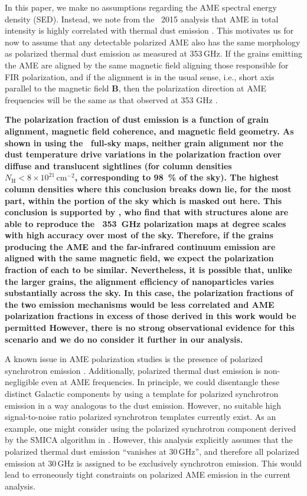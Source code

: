\documentclass[twocolumn]{aa}
\begin{document}
In this paper, we make no assumptions regarding the AME spectral
energy density (SED). Instead, we note from the \Planck\ 2015 analysis
that AME in total intensity is highly correlated with thermal dust
emission \citep{planck2014-a12}.
This motivates us for now to assume that any detectable polarized AME
also has the same morphology as polarized thermal dust emission as
measured at 353\,GHz.  If the grains emitting the AME are aligned by
the same magnetic field aligning those responsible for FIR
polarization, and if the alignment is in the usual sense, i.e., short
axis parallel to the magnetic field \textbf{B}, then the polarization
direction at AME frequencies will be the same as that observed at 353
GHz \citep{draine1998_a}.

\textbf{The polarization fraction of dust emission is a function of grain alignment, magnetic field coherence, and magnetic field geometry. As shown in \cite{planck2016-l11B} using the \Planck\ full-sky maps, neither grain alignment nor the dust temperature drive variations in the polarization fraction over diffuse and translucent sightlines (for column densities $N_{\mathrm{H}} < 8\times10^{21}\,\mathrm{cm}^{-2}$, corresponding to 98~\% of the sky). The highest column densities where this conclusion breaks down lie, for the most part, within the portion of the sky which is masked out here. This conclusion is supported by \cite{Clark_2019}, who find that with  structures alone are able to reproduce the \Planck\ 353~GHz polarization maps at degree scales with high accuracy over most of the sky. Therefore, if the grains producing the AME and the far-infrared continuum emission are aligned with the same magnetic field, we expect the polarization fraction of each to be similar. Nevertheless, it is possible that, unlike the larger grains, the alignment efficiency of nanoparticles varies substantially across the sky. In this case, the polarization fractions of the two emission mechanisms would be less correlated and AME polarization fractions in excess of those derived in this work would be permitted However, there is no strong observational evidence for this scenario and we do no consider it further in our analysis.}

A known issue in AME polarization studies is the presence of polarized
synchrotron emission \citep{planck2014-a31}. Additionally, polarized
thermal dust emission is non-negligible even at AME frequencies. In principle, we could disentangle these
distinct Galactic components by using a template for polarized
synchrotron emission in a way analogous to the dust emission. However,
no suitable high signal-to-noise ratio polarized synchrotron templates
currently exist. As an example, one might consider using the polarized
synchrotron component derived by the SMICA algorithm in
\cite{planck2016-l04}. However, this analysis explicitly assumes that
the polarized thermal dust emission ``vanishes at 30\,GHz'', and
therefore all polarized emission at 30\,GHz is assigned to be
exclusively synchrotron emission. This would lead to erroneously tight
constraints on polarized AME emission in the current analysis.
\end{document}
